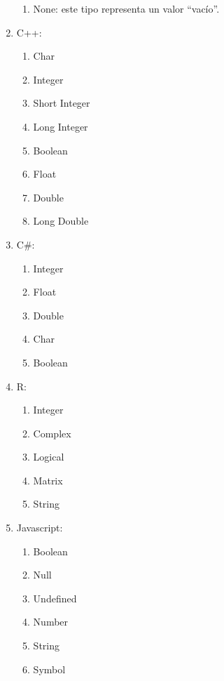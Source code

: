 \documentclass{article}
\begin{document}
\begin{enumerate}
\begin{enumerate}
		\item None: este tipo representa un valor “vacío”.
	\end{enumerate}
	\item C++:
	\begin{enumerate}
		\item Char
		\item Integer
		\item Short Integer
		\item Long Integer
		\item Boolean 
		\item Float
		\item Double
		\item Long Double 
	\end{enumerate}
	\item C$\#$:
	\begin{enumerate}
		\item Integer
		\item Float 
		\item Double
		\item Char
		\item Boolean
	\end{enumerate}
	\item R:
	\begin{enumerate}
		\item Integer
		\item Complex
		\item Logical
		\item Matrix 
		\item String 
	\end{enumerate}
	\item Javascript:
	\begin{enumerate}
		\item Boolean 
		\item Null
		\item Undefined 
		\item Number
		\item String
		\item Symbol
	\end{enumerate}
\end{enumerate}
\end{document}
